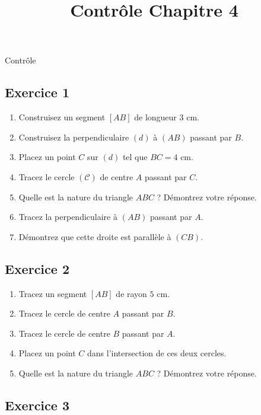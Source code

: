 \documentclass[12 pt]{extarticle}
\title{Contrôle Chapitre 4}
\date{}
\theoremstyle{plain}
\begin{document}
\begin{center}{\Large Contrôle}\\ 
 \end{center}
 
 \subsection*{Exercice 1}
 \begin{enumerate}
 \item Construisez un segment $[AB]$ de longueur $3$ cm. 
 
 
 \item Construisez la perpendiculaire $(d)$ à $(AB)$ passant par $B$.  
 \item Placez un point $C$ sur $(d)$ tel que $BC=4$ cm. 
	
 \item Tracez le cercle $(\mathcal C)$ de centre $A$ passant par $C$.
 
 \item Quelle est la nature du triangle $ABC$ ? Démontrez votre réponse. 
 
 \item Tracez la perpendiculaire à $(AB)$ passant par $A$. 
 
 \item Démontrez que cette droite est parallèle à $(CB)$. 
 
 
 \end{enumerate}
 \subsection*{Exercice 2}
 
 \begin{enumerate}
 \item Tracez un segment $[AB]$ de rayon $5$ cm. 
 
 \item Tracez le cercle de centre $A$ passant par $B$. 
 
 \item Tracez le cercle de centre $B$ passant par $A$. 
 
 \item Placez un point $C$ dans l'intersection de ces deux cercles. 
 
 \item Quelle est la nature du triangle $ABC$ ? Démontrez votre réponse. 
 \end{enumerate}
 
 
 \subsection*{Exercice 3}
 
\end{document}
